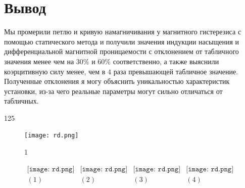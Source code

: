\section*{Вывод}
Мы промерили петлю и кривую намагничивания у магнитного гистерезиса с помощью статического метода и получили значения индукции насыщения и дифференциальной магнитной проницаемости с отклонением от табличного значения менее чем на $30\%$ и $60\%$ соответственно, а также выяснили коэрцитивную силу менее, чем в $4$ раза превышающей табличное значение. Полученные отклонения я могу объяснить уникальностью характеристик установки, из-за чего реальные параметры могут сильно отличаться от табличных. 



125





\lipsum[1-4]
\begin{figure}
\centering
\texttt{[image: rd.png]}
\caption{1}
\end{figure}
\lipsum[1-6]


\begin{figure}[h]
\begin{center}$
\begin{array}{cccc}
\texttt{[image: rd.png]}&
\texttt{[image: rd.png]}&
\texttt{[image: rd.png]}&
\texttt{[image: rd.png]}\\
(1) & (2) & (3) & (4)
\end{array}$
\end{center}
\end{figure}
